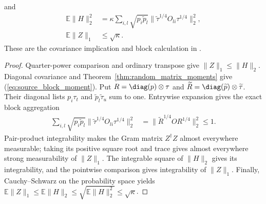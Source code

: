 \begin{theorem}
    and
    \begin{align}
        \mathbb E\lVert H\rVert_2^2
                                  & =\kappa\sum_{i,l}\sqrt{p_i\widetilde p_l}
        \lVert\widetilde\tau^{1/4}O_{li}\tau^{1/4}\rVert_2^2,
        \label{eq:source_block_moment}                                        \\
        \mathbb E\lVert Z\rVert_1 & \leq\sqrt\kappa.
        \label{eq:source_expected_error}
    \end{align}
    These are the covariance implication and block calculation in
    \cite[Equations~(5.14)--(5.18)]{OpenAI2026PolynomialPEPS}.
\end{theorem}

\begin{proof}\leanok
    Quarter-power comparison and ordinary transpose give
    $\lVert Z\rVert_1\leq\lVert H\rVert_2$.
    Diagonal covariance and Theorem~\ref{thm:random_matrix_moments} give
    (\ref{eq:source_block_moment}). Put
    $R=\diag(p)\otimes\tau$ and
    $\widetilde R=\diag(\widetilde p)\otimes\widetilde\tau$.
    Their diagonal lists $p_i\tau_t$ and $\widetilde p_l\widetilde\tau_u$
    sum to one. Entrywise expansion gives the exact block aggregation
    \begin{align}
        \sum_{i,l}\sqrt{p_i\widetilde p_l}
        \lVert\widetilde\tau^{1/4}O_{li}\tau^{1/4}\rVert_2^2
         & =\lVert\widetilde R^{1/4}OR^{1/4}\rVert_2^2\leq1.
        \label{eq:source_aggregation}
    \end{align}
    Pair-product integrability makes the Gram matrix $Z^\dagger Z$
    almost everywhere measurable; taking its positive square root and
    trace gives almost everywhere strong measurability of
    $\lVert Z\rVert_1$.
    The integrable square of $\lVert H\rVert_2$ gives its integrability,
    and the pointwise comparison gives integrability of $\lVert Z\rVert_1$.
    Finally, Cauchy--Schwarz on the probability space yields
    $\mathbb E\lVert Z\rVert_1\leq\mathbb E\lVert H\rVert_2
        \leq\sqrt{\mathbb E\lVert H\rVert_2^2}\leq\sqrt\kappa$.
\end{proof}

